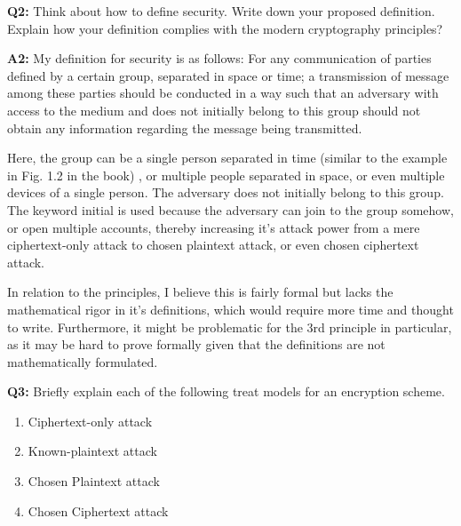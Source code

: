 \documentclass[12pt,reqno]{amsart}
\begin{document}
\vspace{20px}

\textbf{Q2:} Think about how to define security. Write down your proposed definition. Explain how your definition complies with the modern cryptography principles?

\textbf{A2:} My definition for security is as follows: For any communication of ﻿﻿﻿﻿﻿﻿﻿﻿﻿﻿﻿﻿﻿﻿parties defined by a certain group,﻿﻿﻿﻿﻿ separated in space or time; ﻿﻿﻿﻿﻿﻿﻿a transmission of message among these parties should be conducted in a way ﻿﻿﻿﻿such that an adversary with access to the medium and ﻿does not initially ﻿belong to this group should not obtain any information regarding the message being transmitted.﻿﻿﻿﻿﻿﻿﻿﻿

Here, the group can be a single person separated in time (similar to the example in Fig. 1.2 in the book) ﻿﻿﻿﻿﻿﻿﻿﻿﻿﻿﻿﻿﻿﻿﻿﻿﻿﻿﻿﻿﻿﻿﻿, or multiple people separated in space, or even multiple devices of a single person. The adversary does not initially belong to this group. The keyword initial is used because the adversary can join to the group somehow, or open multiple accounts, thereby increasing it's attack power from a mere ciphertext-only attack to chosen plaintext attack, or even chosen ciphertext attack.

In relation to the principles, I believe this is fairly formal but lacks the mathematical rigor in it's definitions, which would require more time and thought to write. Furthermore, it might be problematic for the 3rd principle in particular, as it may be hard to prove formally given that the definitions are not mathematically formulated.

\vspace{20px}
\textbf{Q3:}
Briefly explain each of the following treat models for an encryption scheme.
\begin{enumerate}[label=\alph*]
\item Ciphertext-only attack
\item Known-plaintext attack
\item Chosen Plaintext attack
\item Chosen Ciphertext attack
\end{enumerate}
\end{document}
